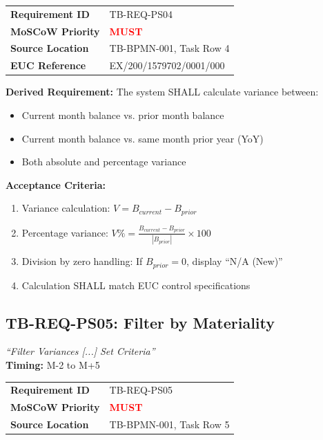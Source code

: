 \documentclass[11pt,a4paper,twoside]{report}
\begin{document}
\begin{tabularx}{\textwidth}{@{}lX@{}}
\toprule
\textbf{Requirement ID} & TB-REQ-PS04 \\
\textbf{MoSCoW Priority} & \textcolor{red}{\textbf{MUST}} \\
\textbf{Source Location} & TB-BPMN-001, Task Row 4 \\
\textbf{EUC Reference} & EX/200/1579702/0001/000 \\
\bottomrule
\end{tabularx}

\textbf{Derived Requirement:} The system SHALL calculate variance between:
\begin{itemize}
\item Current month balance vs. prior month balance
\item Current month balance vs. same month prior year (YoY)
\item Both absolute and percentage variance
\end{itemize}

\textbf{Acceptance Criteria:}
\begin{enumerate}[label=AC-PS04-\arabic*:]
\item Variance calculation: $V = B_{current} - B_{prior}$
\item Percentage variance: $V\% = \frac{B_{current} - B_{prior}}{|B_{prior}|} \times 100$
\item Division by zero handling: If $B_{prior} = 0$, display ``N/A (New)''
\item Calculation SHALL match EUC control specifications
\end{enumerate}

\subsection{TB-REQ-PS05: Filter by Materiality}
\label{req:tb-req-ps05}

\begin{tcolorbox}[colback=sourcegreen!5,colframe=sourcegreen!70,title=BPMN Task Extract]
\textit{``Filter Variances [...] Set Criteria''}\\
\textbf{Timing:} M-2 to M+5
\end{tcolorbox}

\begin{tabularx}{\textwidth}{@{}lX@{}}
\toprule
\textbf{Requirement ID} & TB-REQ-PS05 \\
\textbf{MoSCoW Priority} & \textcolor{red}{\textbf{MUST}} \\
\textbf{Source Location} & TB-BPMN-001, Task Row 5 \\
\bottomrule
\end{tabularx}
\end{document}
